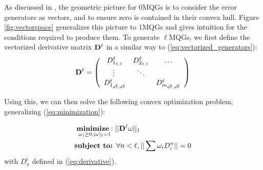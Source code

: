 \documentclass[aps,nofootinbib,pra,notitlepage,twocolumn]{revtex4-1}
\begin{document}
As discussed in \cite{Campbell2017}, the geometric picture for 0MQGs is to consider the error generators as vectors, and to ensure zero is contained in their convex hull. Figure \ref{fig:vectorspace} generalizes this picture to 1MQGs and gives intuition for the conditions required to produce them. To generate $\ell$MQGs, we first define the vectorized derivative matrix ${\bold{D}^{\ell}}$ in a similar way to (\ref{eq:vectorized_generators}):
\begin{equation}
{\bold{D}^{\ell}} =  \left(\begin{array}{cccc}
		D^\ell_{1_{1,1}} & D^\ell_{2_{1,1}} & \ldots   \\ 
		\vdots\ & \ddots &    \\
		D^\ell_{1_{d^2,d^2}} &  &  D^\ell_{m_{d^2,d^2}} \\ 
	\end{array} 	
	\right)
\end{equation}

Using this, we can then solve the following convex optimization problem, generalizing (\ref{eq:minimization}):

\begin{equation}\label{eq:robust_minimization}
  \begin{split}
    &\underset{\omega_i\geq0, |\omega|_1=1}{\textbf{minimize}: } ||{\bold{D}^{\ell}}\omega||_1\\
    &\textbf{subject to: } \forall n<\ell, ||\sum \omega_iD_i^n||=0\\
  \end{split}
\end{equation}
with $D_n^i$ defined in (\ref{eq:derivative}). 
\end{document}
